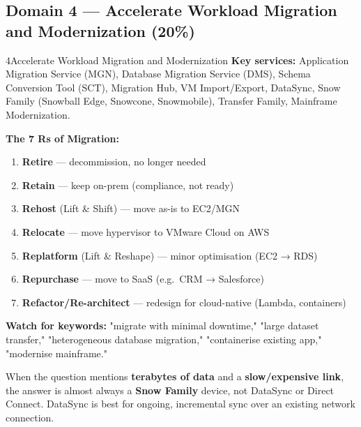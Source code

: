 \subsection{Domain 4 — Accelerate Workload Migration and Modernization (20\%)}

\begin{domainsummary}{4}{Accelerate Workload Migration and Modernization}
\textbf{Key services:} Application Migration Service (MGN), Database Migration Service (DMS),
Schema Conversion Tool (SCT), Migration Hub, VM Import/Export, DataSync, Snow Family
(Snowball Edge, Snowcone, Snowmobile), Transfer Family, Mainframe Modernization.

\textbf{The 7 Rs of Migration:}
\begin{enumerate}
  \item \textbf{Retire} — decommission, no longer needed
  \item \textbf{Retain} — keep on-prem (compliance, not ready)
  \item \textbf{Rehost} (Lift \& Shift) — move as-is to EC2/MGN
  \item \textbf{Relocate} — move hypervisor to VMware Cloud on AWS
  \item \textbf{Replatform} (Lift \& Reshape) — minor optimisation (EC2 → RDS)
  \item \textbf{Repurchase} — move to SaaS (e.g.\ CRM → Salesforce)
  \item \textbf{Refactor/Re-architect} — redesign for cloud-native (Lambda, containers)
\end{enumerate}

\textbf{Watch for keywords:} "migrate with minimal downtime," "large dataset transfer,"
"heterogeneous database migration," "containerise existing app," "modernise mainframe."
\end{domainsummary}

\begin{examtip}[title={\faLightbulb~Migration exam tip}]
When the question mentions \textbf{terabytes of data} and a \textbf{slow/expensive link},
the answer is almost always a \textbf{Snow Family} device, not DataSync or Direct Connect.
DataSync is best for ongoing, incremental sync over an existing network connection.
\end{examtip}
